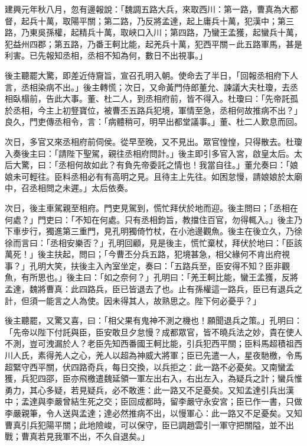 建興元年秋八月，忽有邊報說：「魏調五路大兵，來取西川：第一路，曹真為大都督，起兵十萬，取陽平關；第二路，乃反將孟達，起上庸兵十萬，犯漢中；第三路，乃東吳孫權，起精兵十萬，取峽口入川；第四路，乃蠻王孟獲，起蠻兵十萬，犯益州四郡；第五路，乃番王軻比能，起羌兵十萬，犯西平關－此五路軍馬，甚是利害。已先報知丞相，丞相不知為何，數日不出視事。」

後主聽罷大驚，即差近侍齎旨，宣召孔明入朝。使命去了半日，「回報丞相府下人言，丞相染病不出。」後主轉慌；次日，又命黃門侍郎董允、諫議大夫杜瓊，去丞相臥榻前，告此大事。董、杜二人，到丞相府前，皆不得入。杜瓊曰：「先帝託孤於丞相，今主上初豋寶位，被曹丕五路兵犯境，軍情至急，丞相何故推病不出？」良久，門吏傳丞相令，言：「病體稍可，明早出都堂議事。」董、杜二人歎息而回。

次日，多官又來丞相府前伺侯。從早至晚，又不見出。眾官惶惶，只得散去。杜瓊入奏後主曰：「請陛下聖駕，親往丞相府問計。」後主即引多官入宮，啟皇太后。太后大驚，曰：「丞相何故如此？有負先帝委託之情也！我當自往。」董允奏曰：「娘娘未可輕往。臣料丞相必有有高明之見。且待主上先往。如困怠慢，請娘娘於太廟中，召丞相問之未遲。」太后依奏。

次日，後主車駕親至相府。門吏見駕到，慌忙拜伏於地而迎。後主問曰；「丞相在何處？」門吏曰：「不知在何處。只有丞相鈞旨，教擋住百官，勿得輒入。」後主乃下車步行，獨進第三重門，見孔明獨倚竹杖，在小池邊觀魚。後主在後立久，乃徐徐而言曰：「丞相安樂否？」孔明回顧，見是後主，慌忙棄杖，拜伏於地曰：「臣該萬死！」後主扶起，問曰；「今曹丕分兵五路，犯境甚急，相父緣何不肯出府視事？」孔明大笑，扶後主入內室坐定，奏曰：「五路兵至，臣安得不知？臣非觀魚，有所思也。」後主曰：「如之奈何？」孔明曰：「羌王軻比能，蠻王孟獲，反將孟達，魏將曹真：此四路兵，臣已皆退去了也。止有孫權這一路兵，臣已有退兵之計，但須一能言之人為使。因未得其人，故熟思之。陛下何必憂乎？」

後主聽罷，又驚又喜，曰：「相父果有鬼神不測之機也！願聞退兵之策。」孔明曰：「先帝以陛下付託與臣，臣安敢旦夕怠慢？成都眾官，皆不曉兵法之妙，貴在使人不測，豈可洩漏於人？老臣先知西番國王軻比能，引兵犯西平關；臣料馬超積祖西川人氏，素得羌人之心，羌人以超為神威大將軍；臣已先遣一人，星夜馳檄，令馬超緊守西平關，伏四路奇兵，每日交換，以兵拒之：此一路不必憂矣。又南蠻孟獲，兵犯四邵，臣亦飛檄遣魏延領一軍左出右入，右出左入，為疑兵之計；蠻兵惟勇力，其心多疑，若見疑兵，必不敢進：此一路又不足憂矣。又知孟達引兵出漢中；孟達與李嚴曾結生死之交；臣回成都時，留李嚴守永安宮；臣已作一書，只做李嚴親筆，令人送與孟達；達必然推病不出，以慢軍心：此一路又不足憂矣。又知曹真引兵犯陽平關；此地險峻，可以保守，臣已調趙雲引一軍守把關隘，並不出戰；曹真若見我軍不出，不久自退矣。」

